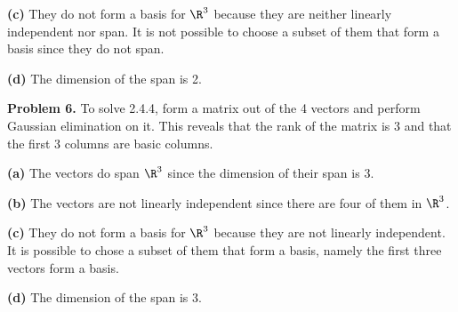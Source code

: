 \documentclass[oneside,12pt]{amsart}
\begin{document}
\textbf{(c)} They do not form a basis for $\R^3$ because they are neither linearly independent
nor span. It is not possible to choose a subset of them that form a basis since they do
not span.

\textbf{(d)} The dimension of the span is 2.


\bigskip

\textbf{Problem 6.} To solve 2.4.4, form a matrix out of the 4 vectors and
perform Gaussian elimination on it. This reveals that the rank of the matrix
is 3 and that the first 3 columns are basic columns.

\bigskip

\textbf{(a)} The vectors do  span $\R^3$ since the dimension of their span is 3.

\textbf{(b)} The vectors are not linearly independent since  there are four of them in $\R^3$.

\textbf{(c)} They do not form a basis for $\R^3$ because they are not linearly independent.
It is possible to chose a subset of them that form a basis, namely the first three vectors
form a basis.

\textbf{(d)} The dimension of the span is 3.

\bigskip

\end{document}
